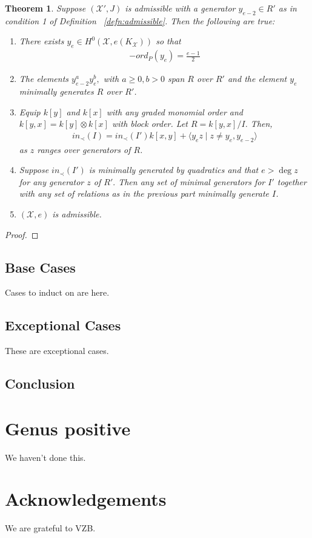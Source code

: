 \documentclass{amsart}
\theoremstyle{plain}
\newtheorem{thm}{Theorem}[section]
\theoremstyle{definition}
\theoremstyle{remark}
\numberwithin{equation}{section}
\newcommand\ssec{\subsection}
\newcommand \sx{\mathscr X}
\begin{document}
\begin{thm}
\label{thm:ramification_order_induction}
Suppose $(\sx',J)$ is admissible with a generator $y_{e-2} \in R'$
as in condition 1 of Definition ~\ref{defn:admissible}. Then the
following are true:

\begin{enumerate}
	\item There exists $y_e \in H^0(\sx, e(K_\sx))$ so that 
	\begin{align*}
	-ord_P(y_e) = \frac{e-1}{2}
\end{align*}

\item The elements $y_{e-2}^ay_e^b,$ with $a \geq 0, b > 0$ span $R$
		over $R'$ and the element $y_e$ minimally generates $R$ over $R'$.
\item Equip $k[y]$ and $k[x]$ with any graded monomial order and
		$k[y,x] = k[y] \otimes k[x]$ with block order. Let $R = k[y,x]/I$.
		Then,
		\begin{align*}
			in_\prec(I) = in_\prec(I')k[x,y] + \langle y_ez \mid z \neq y_e,y_
			{e-2} \rangle 
		\end{align*}
		as $z$ ranges over generators of $R$.
\item Suppose $in_\prec(I')$ is minimally generated by quadratics 
		and that $e > \deg z$ for any generator $z$ of $R'.$ Then any set 
		of minimal generators for $I'$ together with any set of relations 
		as in the previous part  
		minimally generate $I$. 
\item $(\sx,e)$ is admissible.
\end{enumerate}
\end{thm}

\begin{proof}

\end{proof}

\ssec{Base Cases}
\label{ssec:g_0_base}
Cases to induct on are here.

\ssec{Exceptional Cases}
\label{ssec:g_0_exceptional}
These are exceptional cases.

\ssec{Conclusion}
\label{ssec:g_0_conclusion}

\section{Genus positive}
We haven't done this.

\section{Acknowledgements}
We are grateful to VZB.

\nocite{*}
{}

\end{document}
